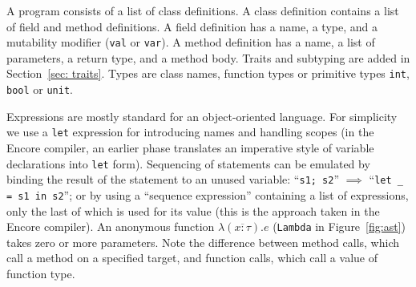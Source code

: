 \documentclass[sigplan,screen]{acmart}
\makeatletter
\newcommand{\ec}[1]{\lstinline[style=encore,breaklines=true,basicstyle=\fontsize{9}{9}\tt]@#1@}
\makeatother
\begin{document}
A program consists of a list of class definitions. A class
definition contains a list of field and method definitions. A
field definition has a name, a type, and a mutability modifier
(\ec{val} or \ec{var}). A method definition has a name, a list of
parameters, a return type, and a method
body. Traits and subtyping are added in Section~\ref{sec: traits}.
Types are class names, function types or primitive
types \ec{int}, \ec{bool} or \ec{unit}.

Expressions are mostly standard for an object-oriented language.
For simplicity we use a \ec{let} expression for introducing names
and handling scopes (in the Encore compiler, an earlier phase
translates an imperative style of variable declarations into
\ec{let} form). Sequencing of statements can be emulated by
binding the result of the statement to an unused variable:
%
``\ec{s1; s2}'' $\implies$ ``\ec{let _ = s1 in s2}'';
%
or by using a ``sequence expression'' containing a list of
expressions, only the last of which is used for its value (this is
the approach taken in the Encore compiler).
%
An anonymous function $\lambda(\overline{x : \tau}) . e$
(\ec{Lambda} in Figure~\ref{fig:ast}) takes zero or more
parameters. Note the difference between method calls, which call a
method on a specified target, and function calls, which call a
value of function type.
\end{document}
